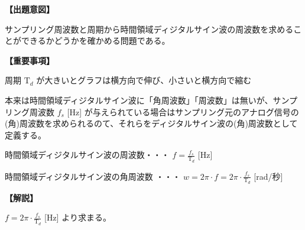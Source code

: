 \noindent \textbf{【出題意図】}

\bigskip
\noindent サンプリング周波数と周期から時間領域ディジタルサイン波の周波数を求めることができるかどうかを確かめる問題である。

\vspace{1em}
\noindent \textbf{【重要事項】}

\bigskip
\noindent 周期 $\textrm{T}_d$ が大きいとグラフは横方向で伸び、小さいと横方向で縮む

\bigskip
\noindent 本来は時間領域ディジタルサイン波に「角周波数」「周波数」は無いが、サンプリング周波数 $f_s$ [Hz] が与えられている場合はサンプリング元のアナログ信号の(角)周波数を求められるのて、それらをディジタルサイン波の(角)周波数として定義する。

\bigskip
\noindent 時間領域ディジタルサイン波の周波数・・・ $f = \frac{f_s}{\textrm{T}_d}$ [Hz]

\bigskip
\noindent 時間領域ディジタルサイン波の角周波数 ・・・ $w = 2\pi \cdot f = 2 \pi \cdot \frac{f_s}{\textrm{T}_d}$ [rad/秒]

\bigskip

\vspace{1em}
\noindent \textbf{【解説】}

\bigskip
\noindent $f = 2\pi \cdot \frac{f_s}{\textrm{T}_d}$ [Hz] より求まる。
